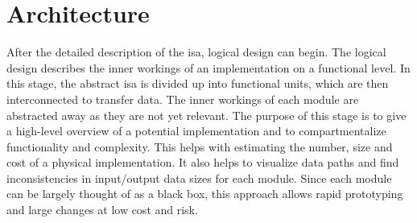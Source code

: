 \clearpage
\section{Architecture} \label{sec:implementation_architecture}

After the detailed description of the \ac{isa}, logical design can begin. The logical design describes the inner workings of an implementation on a functional level. In this stage, the abstract \ac{isa} is divided up into functional units, which are then interconnected to transfer data. The inner workings of each module are abstracted away as they are not yet relevant. The purpose of this stage is to give a high-level overview of a potential implementation and to compartmentalize functionality and complexity. This helps with estimating the number, size and cost of a physical implementation. It also helps to visualize data paths and find inconsistencies in input/output data sizes for each module. Since each module can be largely thought of as a black box, this approach allows rapid prototyping and large changes at low cost and risk. 


